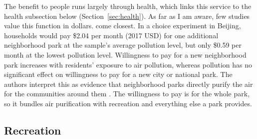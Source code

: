 \documentclass[12pt]{article}
\begin{document}
The benefit to people runs largely through health, which links this service to the health subsection below (Section~\ref{sec:health}). As far as I am aware, few studies value this function in dollars. \citet{liuLinkingUrbanAir2020} come closest. In a choice experiment in Beijing, households would pay \$2.04 per month (2017 USD) for one additional neighborhood park at the sample's average pollution level, but only \$0.59 per month at the lowest pollution level. Willingness to pay for a new neighborhood park increases with residents' exposure to air pollution, whereas pollution has no significant effect on willingness to pay for a new city or national park. The authors interpret this as evidence that neighborhood parks directly purify the air for the communities around them \citep{liuLinkingUrbanAir2020}. The willingness to pay is for the whole park, so it bundles air purification with recreation and everything else a park provides.

\subsection{Recreation}\label{sec:recreation}
\end{document}
